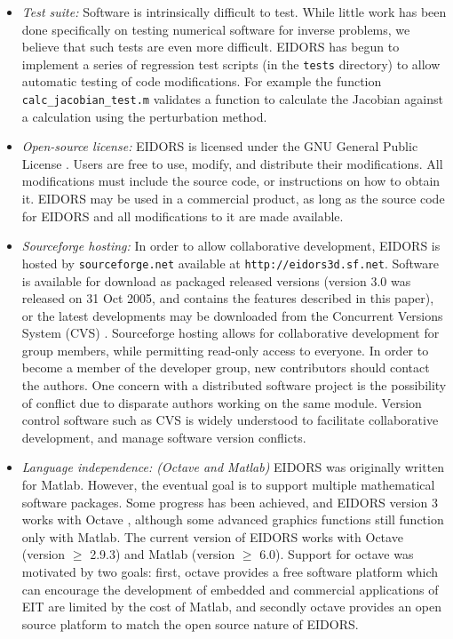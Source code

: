 \documentclass[12pt]{iopart}
\begin{document}
\begin{itemize}
  \item {\em Test suite:}
Software is intrinsically difficult to test. While little work
has been done specifically on testing numerical software
for inverse problems, we
believe that such tests are even more difficult.
EIDORS has begun to implement a series of regression test
scripts (in the {\tt tests} directory)
to allow automatic testing of code modifications.
For example the function {\tt calc\_jacobian\_test.m}
validates a function to calculate the Jacobian against
a calculation using the perturbation method. 

  \item {\em Open-source license:}
EIDORS is licensed under the
GNU General Public License \cite{Free_Software_Foundation_1991}.
Users are free to use, modify, and
distribute their modifications. All modifications must include the
source code, or instructions on how to obtain it. EIDORS may be used
in a commercial product, as long as the source code for EIDORS and all
modifications to it are made available.

  \item {\em Sourceforge hosting:}
In order to allow collaborative development, 
EIDORS is hosted by {\tt sourceforge.net}
available at {\tt http://eidors3d.sf.net}.
Software is available for download as packaged released versions
(version 3.0 was released on 31 Oct 2005, and
contains the features described in this paper),
or the latest developments may be downloaded from the
Concurrent Versions System (CVS) \cite{Cederqvist_2002}.
Sourceforge hosting allows for collaborative development for
group members, while permitting read-only access to everyone.
In order to become a member of the developer group, new
contributors should contact the authors.
One concern with a distributed software project is
the possibility of conflict due to disparate authors
working on the same module.
Version control software such as CVS is widely understood
to facilitate collaborative development, and manage
software version conflicts.


  \item {\em Language independence: (Octave and Matlab)}
EIDORS was originally written for Matlab.
However, the eventual goal is to support multiple
mathematical software packages.
Some progress has been achieved, and EIDORS version 3
works with Octave \cite{Eaton_2002}, although some 
advanced graphics functions still function only with Matlab.
The current version of EIDORS works with Octave
(version $\ge$ 2.9.3)
and Matlab (version $\ge$ 6.0).
Support for octave was motivated by two goals:
first, octave provides a free software platform
which can encourage the development of embedded
and commercial applications of EIT
are limited by the cost of Matlab, and secondly
octave provides an open source platform to match
the open source nature of EIDORS.


\end{itemize}
\end{document}
